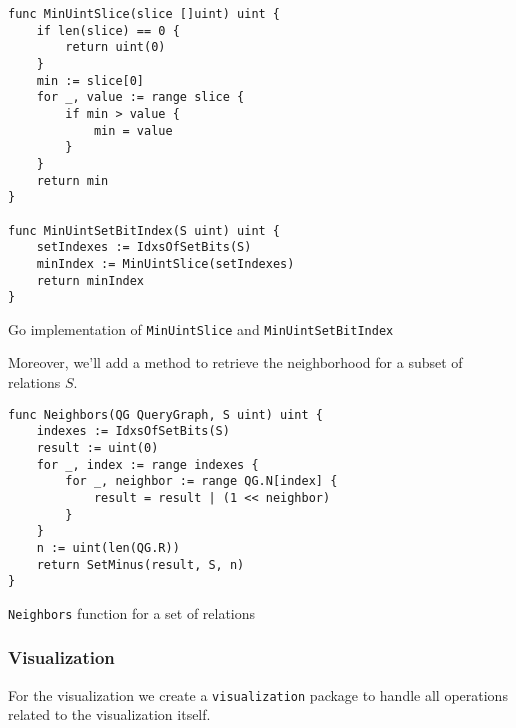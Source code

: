 \begin{algorithm}[H]
\begin{verbatim}
func MinUintSlice(slice []uint) uint {
    if len(slice) == 0 {
        return uint(0)
    }
    min := slice[0]
    for _, value := range slice {
        if min > value {
            min = value
        }
    }
    return min
}

func MinUintSetBitIndex(S uint) uint {
	setIndexes := IdxsOfSetBits(S)
	minIndex := MinUintSlice(setIndexes)
	return minIndex
}
\end{verbatim}
\caption{Go implementation of \texttt{MinUintSlice} and \texttt{MinUintSetBitIndex}}
\label{alg:implementation-minuintslice}
\end{algorithm}
\vspace{0.5cm}


Moreover, we'll add a method to retrieve the neighborhood for a subset of relations $S$.

\begin{algorithm}[H]
\begin{verbatim}
func Neighbors(QG QueryGraph, S uint) uint {
    indexes := IdxsOfSetBits(S)
    result := uint(0)
    for _, index := range indexes {
        for _, neighbor := range QG.N[index] {
            result = result | (1 << neighbor)
        }
    }
    n := uint(len(QG.R))
    return SetMinus(result, S, n)
}
\end{verbatim}
\caption{\texttt{Neighbors} function for a set of relations}
\end{algorithm}
\vspace{0.5cm}

\subsubsection{Visualization}

For the visualization we create a \texttt{visualization} package to handle all operations related to the visualization itself. 


